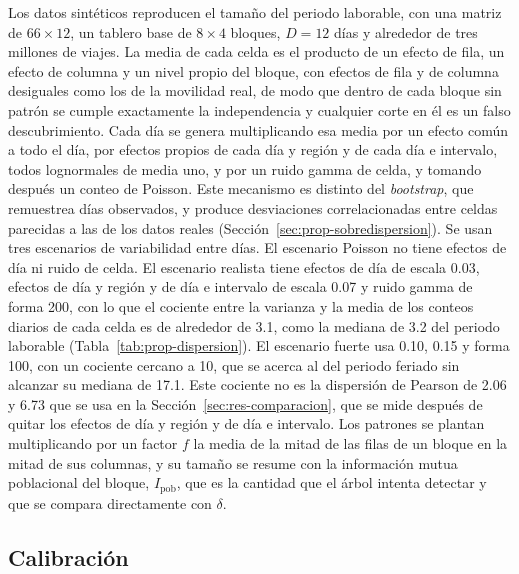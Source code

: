 Los datos sintéticos reproducen el tamaño del periodo laborable, con una matriz de
$66 \times 12$, un tablero base de $8 \times 4$ bloques, $D = 12$ días y alrededor
de tres millones de viajes. La media de cada celda es el producto de un efecto de
fila, un efecto de columna y un nivel propio del bloque, con efectos de fila y de
columna desiguales como los de la movilidad real, de modo que dentro de cada bloque
sin patrón se cumple exactamente la independencia y cualquier corte en él es un
falso descubrimiento. Cada día se genera multiplicando esa media por un efecto
común a todo el día, por efectos propios de cada día y región y de cada día e
intervalo, todos lognormales de media uno, y por un ruido gamma de celda, y
tomando después un conteo de Poisson. Este mecanismo es distinto del
\emph{bootstrap}, que remuestrea días observados, y produce desviaciones
correlacionadas entre celdas parecidas a las de los datos reales
(Sección~\ref{sec:prop-sobredispersion}). Se usan tres escenarios de
variabilidad entre días. El escenario Poisson no tiene efectos de día ni ruido de
celda. El escenario realista tiene efectos de día de escala 0.03, efectos de día y
región y de día e intervalo de escala 0.07 y ruido gamma de forma 200, con lo que
el cociente entre la varianza y la media de los conteos diarios de cada celda es
de alrededor de 3.1, como la mediana de 3.2 del periodo laborable
(Tabla~\ref{tab:prop-dispersion}). El escenario fuerte usa 0.10, 0.15 y forma
100, con un cociente cercano a 10, que se acerca al del periodo feriado sin
alcanzar su mediana de 17.1. Este cociente no es la dispersión de Pearson de 2.06
y 6.73 que se usa en la Sección~\ref{sec:res-comparacion}, que se mide después de
quitar los efectos de día y región y de día e intervalo. Los patrones se plantan multiplicando por un
factor $f$ la media de la mitad de las filas de un bloque en la mitad de sus
columnas, y su tamaño se resume con la información mutua poblacional del bloque,
$I_{\mathrm{pob}}$, que es la cantidad que el árbol intenta detectar y que se
compara directamente con $\delta$.

\subsection{Calibración}

